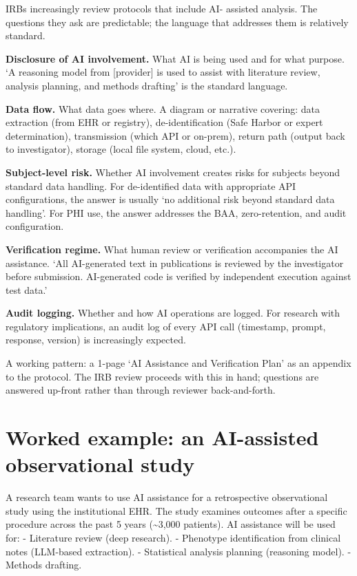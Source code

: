 \documentclass[
  letterpaper,
  11pt]{scrbook}
\begin{document}
IRBs increasingly review protocols that include AI- assisted analysis.
The questions they ask are predictable; the language that addresses them
is relatively standard.

\textbf{Disclosure of AI involvement.} What AI is being used and for
what purpose. `A reasoning model from {[}provider{]} is used to assist
with literature review, analysis planning, and methods drafting' is the
standard language.

\textbf{Data flow.} What data goes where. A diagram or narrative
covering: data extraction (from EHR or registry), de-identification
(Safe Harbor or expert determination), transmission (which API or
on-prem), return path (output back to investigator), storage (local file
system, cloud, etc.).

\textbf{Subject-level risk.} Whether AI involvement creates risks for
subjects beyond standard data handling. For de-identified data with
appropriate API configurations, the answer is usually `no additional
risk beyond standard data handling'. For PHI use, the answer addresses
the BAA, zero-retention, and audit configuration.

\textbf{Verification regime.} What human review or verification
accompanies the AI assistance. `All AI-generated text in publications is
reviewed by the investigator before submission. AI-generated code is
verified by independent execution against test data.'

\textbf{Audit logging.} Whether and how AI operations are logged. For
research with regulatory implications, an audit log of every API call
(timestamp, prompt, response, version) is increasingly expected.

A working pattern: a 1-page `AI Assistance and Verification Plan' as an
appendix to the protocol. The IRB review proceeds with this in hand;
questions are answered up-front rather than through reviewer
back-and-forth.

\section{Worked example: an AI-assisted observational
study}\label{worked-example-an-ai-assisted-observational-study}

A research team wants to use AI assistance for a retrospective
observational study using the institutional EHR. The study examines
outcomes after a specific procedure across the past 5 years
(\textasciitilde3,000 patients). AI assistance will be used for: -
Literature review (deep research). - Phenotype identification from
clinical notes (LLM-based extraction). - Statistical analysis planning
(reasoning model). - Methods drafting.
\end{document}
